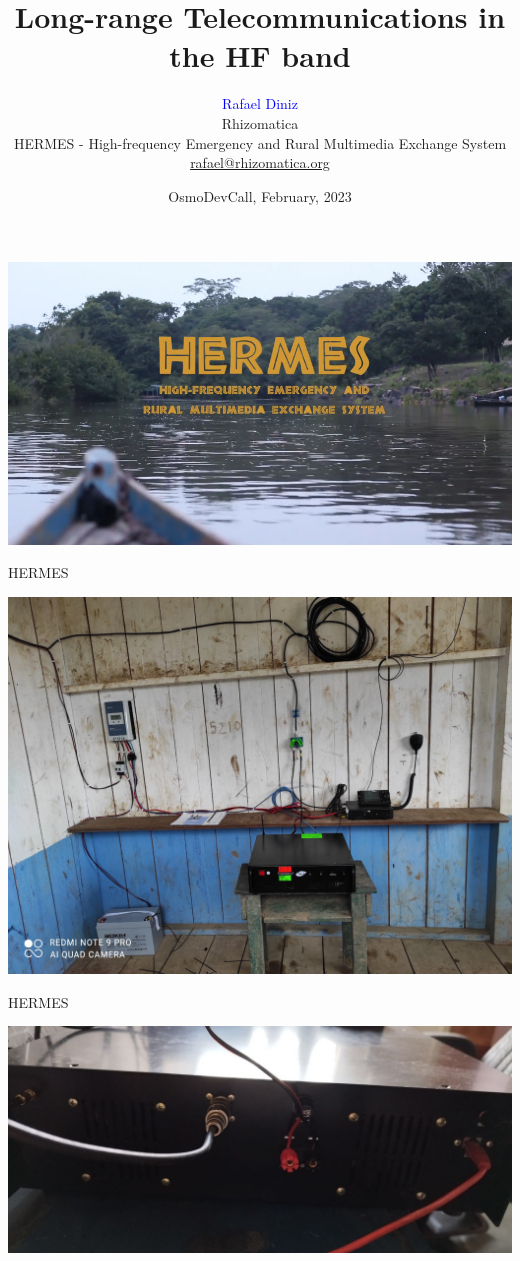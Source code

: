 \documentclass[aspectratio=169,xcolor={x11names,svgnames,dvipsnames}]{beamer}
\author[Rafael Diniz]{\texorpdfstring{\textcolor{blue}{Rafael Diniz} \\
{Rhizomatica} \\
{HERMES - High-frequency Emergency and Rural Multimedia Exchange System}\\
\url{rafael@rhizomatica.org}}{Rafael Diniz}}
\title{Long-range Telecommunications in the HF band}
\subtitle{
\texorpdfstring{ %
\hrulefill\ \adforn{57}\thickspace\wb{.}\thickspace\adforn{29}\ \hrulefill}
}
\date[15-Feb-2023]{OsmoDevCall, February, 2023}
\begin{document}
\begin{frame}[plain]
\maketitle
\end{frame}


\begin{frame}
\begin{center}
  \includegraphics[width=.9\columnwidth]{hermes.png}
\end{center}
\end{frame}


\begin{frame}{HERMES}

\begin{center}
  \includegraphics[width=.7\columnwidth]{hermes.jpeg}
\end{center}

\end{frame}

\begin{frame}{HERMES}

\begin{center}
  \includegraphics[width=.95\columnwidth]{hermes-back.jpeg}
\end{center}

\end{frame}
\end{document}
